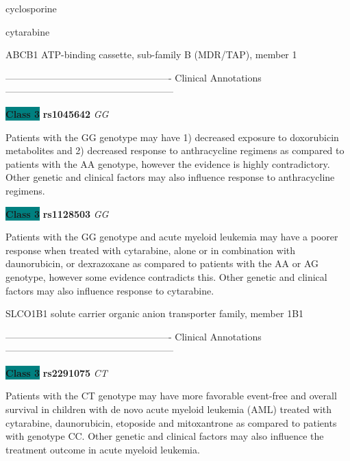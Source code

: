 \documentclass{resume} %
\begin{document}
\begin{rSection}{ cyclosporine }
\end{rSection}\begin{rSection}{ cytarabine }
\item[]

\begin{rSubsection}{ ABCB1 }{ ATP-binding cassette, sub-family B (MDR/TAP), member 1 }{}{}
\item[]

\item[] ---------------------------------------------------- Clinical Annotations -----------------------------------------------------\newline
\item \textbf{\colorbox{teal} {Class 3}} \textbf{ rs1045642 } \textit{ GG }
\item[] Patients with the GG genotype may have 1) decreased exposure to doxorubicin metabolites and 2) decreased response to anthracycline regimens as compared to patients with the AA genotype, however the evidence is highly contradictory. Other genetic and clinical factors may also influence response to anthracycline regimens.\item \textbf{\colorbox{teal} {Class 3}} \textbf{ rs1128503 } \textit{ GG }
\item[] Patients with the GG genotype and acute myeloid leukemia may have a poorer response when treated with cytarabine, alone or in combination with daunorubicin, or dexrazoxane as compared to patients with the AA or AG genotype, however some evidence contradicts this. Other genetic and clinical factors may also influence response to cytarabine.
\end{rSubsection}\begin{rSubsection}{ SLCO1B1 }{ solute carrier organic anion transporter family, member 1B1 }{}{}
\item[]

\item[] ---------------------------------------------------- Clinical Annotations -----------------------------------------------------\newline
\item \textbf{\colorbox{teal} {Class 3}} \textbf{ rs2291075 } \textit{ CT }
\item[] Patients with the CT genotype may have more favorable event-free and overall survival in children with de novo acute myeloid leukemia (AML) treated with cytarabine, daunorubicin, etoposide and mitoxantrone as compared to patients with genotype CC. Other genetic and clinical factors may also influence the treatment outcome in acute myeloid leukemia.
\end{rSubsection}


\end{rSection}
\end{document}
